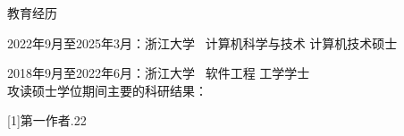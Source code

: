 \cleardoublepage
{}
教育经历

2022年9月至2025年3月：浙江大学  \  计算机科学与技术 \hfill 计算机技术硕士

2018年9月至2022年6月：浙江大学  \  软件工程 \hfill 工学学士
\\

攻读硕士学位期间主要的科研结果：

[1]第一作者.22 